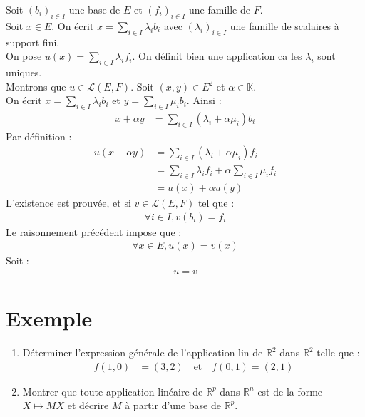 \documentclass[../main.tex]{subfiles}
\begin{document}
\noindent Soit $(b_i)_{i\in I}$ une base de $E$ et $(f_i)_{i\in I}$ une famille de $F$. \\
Soit $x\in E$. On écrit $x = \sum\limits_{i\in I} \lambda_i b_i$ avec $(\lambda_i)_{i\in I}$ une famille de scalaires à support fini. \\
On pose $u(x) = \sum\limits_{i\in I} \lambda_i f_i$. On définit bien une application ca les $\lambda_i$ sont uniques. \\
Montrons que $u\in \mathcal{L}(E, F)$. Soit $(x, y) \in E^2$ et $\alpha \in \mathbb{K}$. \\
On écrit $x = \sum\limits_{i\in I} \lambda_i b_i$ et $y = \sum\limits_{i\in I} \mu_i b_i$. Ainsi : 
\begin{align*}
    x + \alpha y &= \sum_{i\in I} (\lambda_i + \alpha \mu_i) b_i
\end{align*}
Par définition : 
\begin{align*}
    u(x + \alpha y) &= \sum_{i\in I} (\lambda_i + \alpha \mu_i) f_i \\
    &= \sum_{i\in I} \lambda_i f_i + \alpha \sum_{i\in I} \mu_i f_i \\
    &= u(x) + \alpha u(y)
\end{align*}
L'existence est prouvée, et si $v\in \mathcal{L}(E, F)$ tel que : 
\begin{align*}
    \forall i \in I, v(b_i) = f_i
\end{align*}
Le raisonnement précédent impose que : 
\begin{align*}
    \forall x \in E, u(x) = v(x)
\end{align*}
Soit : 
\begin{align*}
    u = v
\end{align*}

\section{Exemple}
\begin{tcolorbox}[title=Exemple 21.64, title filled=false, colframe=darkgreen, colback=darkgreen!10!white]
    \begin{enumerate}
        \item Déterminer l'expression générale de l'application lin de $\mathbb{R}^2$ dans $\mathbb{R}^2$ telle que : 
        \begin{align*}
            f(1, 0) &= (3, 2) \quad \text{et} \quad f(0, 1) = (2, 1)
        \end{align*}

        \item Montrer que toute application linéaire de $\mathbb{R}^p$ dans $\mathbb{R}^n$ est de la forme $X\mapsto MX$ et décrire $M$ à partir d'une base de $\mathbb{R}^p$. 
    \end{enumerate}
\end{tcolorbox}
\end{document}
